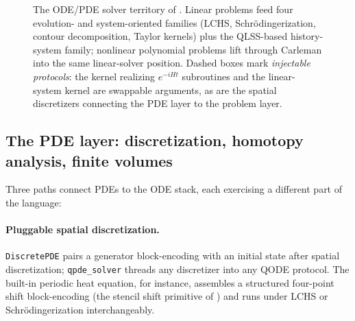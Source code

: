\begin{figure}[t]
  \caption{The ODE/PDE solver territory of \pqlang{}.  Linear problems feed
  four evolution- and system-oriented families (LCHS, Schr\"odingerization,
  contour decomposition, Taylor kernels) plus the QLSS-based history-system
  family; nonlinear polynomial problems lift through Carleman into the same
  linear-solver position.  Dashed boxes mark \emph{injectable protocols}:
  the kernel realizing $e^{-iHt}$ subroutines and the linear-system kernel
  are swappable arguments, as are the spatial discretizers connecting the
  PDE layer to the problem layer.}
  \label{fig:ode-taxonomy}
\end{figure}

\subsection{The PDE layer: discretization, homotopy analysis, finite volumes}
\label{sec:pde}

Three paths connect PDEs to the ODE stack, each exercising a different part
of the language:

\paragraph{Pluggable spatial discretization.}
\texttt{DiscretePDE} pairs a generator block-encoding with an initial state
after spatial discretization; \texttt{qpde\_solver} threads any
discretizer into any QODE protocol.  The built-in periodic heat equation,
for instance, assembles a structured four-point shift block-encoding (the
stencil shift primitive of ) and runs under LCHS or
Schr\"odingerization interchangeably.

